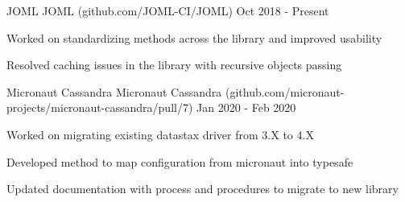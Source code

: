 

\begin{cventries}

    
        \cventry
    {JOML} %
    {JOML ({\tiny github.com/JOML-CI/JOML})} %
    {} %
    { Oct 2018 - Present} %
    {
      \begin{cvitems} %
        \item{Worked on standardizing methods across the library and improved usability}
        \item{Resolved caching issues in the library with recursive objects passing}
      \end{cvitems}
    }
    
       \cventry
    {Micronaut Cassandra} %
    {Micronaut Cassandra ({\tiny github.com/micronaut-projects/micronaut-cassandra/pull/7})} %
    {} %
    {Jan 2020 - Feb 2020} %
    {
      \begin{cvitems} %
        \item{Worked on migrating existing datastax driver from 3.X to 4.X }
        \item{Developed method to map configuration from micronaut into typesafe}
        \item{Updated documentation with process and procedures to migrate to new library}
      \end{cvitems}
    }
   

\end{cventries}
